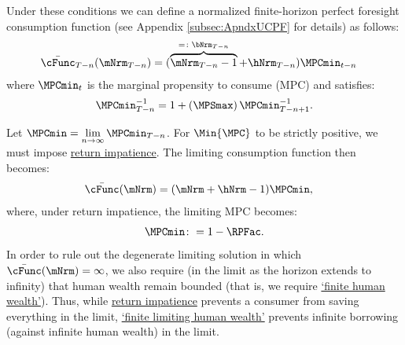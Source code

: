 \documentclass[BufferStockTheory]{subfiles}
\begin{document}
Under these conditions we can define a normalized finite-horizon perfect foresight consumption function (see Appendix \ref{subsec:ApndxUCPF} for details) as follows:\hypertarget{MPCminDefn}{}
%
\begin{equation}\begin{gathered}\begin{aligned}
  \bar{\cFunc}_{T-n}(\mNrm_{T-n})  & = (\overbrace{\mNrm_{T-n}-1}^{
                                     = \colon  \bNrm_{T-n}}+\hNrm_{T-n})\MPCmin_{t-n}
\end{aligned}\end{gathered}\end{equation}
%
where $\MPCmin_{t}$ is the marginal propensity to consume (MPC) and satisfies:
%
\begin{equation}\begin{gathered}\begin{aligned}\label{eq:PFMPCminInv}
\MPCmin_{T-n}^{-1}  = 1+\left(\MPSmax\right) \MPCmin_{T-n+1}^{-1}.
\end{aligned}\end{gathered}\end{equation}
%

Let $\MPCmin = \lim\limits_{n\rightarrow\infty}\MPCmin_{T-n}$.
For $\Min{\MPC}$ to be strictly positive, we must impose \hyperlink{RIC}{return impatience}.
The limiting consumption function then becomes:
%
\begin{equation}\begin{gathered}\begin{aligned}\label{eq:cFuncPFUnc}
  \bar{\cFunc}(\mNrm)  & = (\mNrm+\hNrm-1)\MPCmin,
\end{aligned}\end{gathered}\end{equation}
%
where, under return impatience, the limiting MPC becomes:
%
%
\begin{equation}\label{eq:MPCminDef}
\MPCmin \colon = 1-\RPFac.
\end{equation}
%
%
%
In order to rule out the degenerate limiting solution in which $\bar{\cFunc}(\mNrm) = \infty$, we also require (in the limit as the horizon extends to infinity) that human wealth remain bounded (that is, we require \hyperlink{FHWC}{`finite human wealth'}).
Thus, while \hyperlink{RIC}{return impatience} prevents a consumer from saving everything in the limit,  \hyperlink{FHWC}{`finite limiting  human wealth'} prevents infinite borrowing (against infinite human wealth) in the limit.
\end{document}
